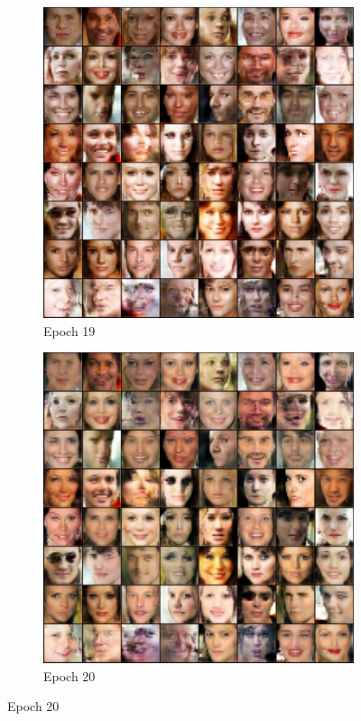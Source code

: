 \begin{figure}[hbt]
\begin{subfigure}[b]{0.3\textwidth}
        \includegraphics[width=\textwidth]{chapters/Experiments/Other/dcgan_celeba19.png}
        \caption{Epoch 19}
        \end{subfigure}
    \hfill
        \begin{subfigure}[b]{0.3\textwidth}
        \centering
        \includegraphics[width=\textwidth]{chapters/Experiments/Other/dcgan_celeba20.png}
        \caption{Epoch 20}
        \end{subfigure}
    \label{fig:dcgan_celeba}
\end{figure}



